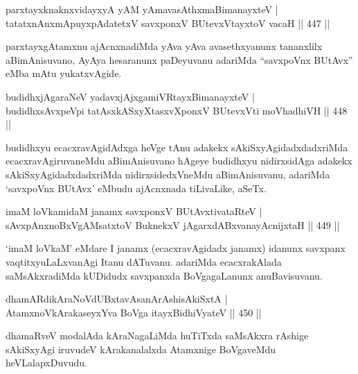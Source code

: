 \begin{shl}
parxtayxknaknxvidayxyA yAM yAmavasAthxmaBimanayxteV | \\
tatatxnAnxmApuyxpAdatetxV savxponxV BUtevxVtayxtoV vacaH \hfill||  447 ||  
\end{shl}

\begin{artha}
parxtayxgAtamxnu ajAcnxnadiMda yAva yAva avasethxyanunx tananxlilx aBimAnisuvano, AyAya hesaranunx paDeyuvanu adariMda ``savxpoVnx BUtAvx'' eMba mAtu yukatxvAgide.
\end{artha}


\begin{shl}
budidhxjAgaraNeV yadavxjAjxgamiVRtayxBimanayxteV | \\
budidhxsAvxpeV\s pi tatAsxkASxyXtasxvXponxV BUtevxVti moVhadhiVH \hfill||  448 ||  
\end{shl}

\begin{artha}
budidhxyu ecacxravAgidAdxga heVge tAnu adakekx sAkiSxyAgidadxdadxriMda ecacxravAgiruvaneMdu aBimAnisuvano hAgeye budidhxyu nidirxsidAga adakekx sAkiSxyAgidadxdadxriMda nidirxsidedxVneMdu aBimAnisuvanu, adariMda `savxpoVnx BUtAvx' eMbudu ajAcnxnada tiLivaLike, aSeTx.
\end{artha}

\begin{shl}
imaM loVkamidaM janamx savxponxV BUtAvx\s tivataRteV | \\
sAvxpAnxnoBxVgAMsatxtoV BuknekxV jAgarxdABxvanayA\s cnijxtaH \hfill||  449 ||  
\end{shl}

\begin{artha}
`imaM loVkaM' eMdare I janamx (ecacxravAgidadx janamx) idanunx savxpanx vaqtitxyuLaLxvanAgi Itanu dATuvanu. adariMda ecacxrakAlada saMsAkxradiMda kUDidudx savxpanxda BoVgagaLanunx anuBavisuvanu.
\end{artha}

\begin{shl}
dhamARdikAraNoVdUBxtavAsanArAshisAkiSxtA | \\
AtamxnoV\s kArakaseyxYva BoVga itayxBidhiVyateV \hfill||  450 ||  
\end{shl}

\begin{artha}
dhamaRveV modalAda kAraNagaLiMda huTiTxda saMsAkxra rAshige sAkiSxyAgi iruvudeV kArakanalalxda Atamxnige BoVgaveMdu heVLalapxDuvudu.
\end{artha}

